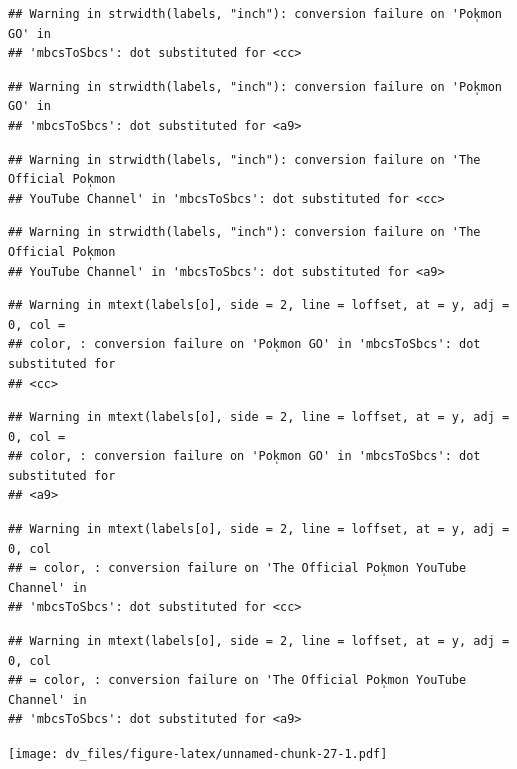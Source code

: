 \documentclass[]{article}
\begin{document}
\begin{verbatim}
## Warning in strwidth(labels, "inch"): conversion failure on 'Pok̩mon GO' in
## 'mbcsToSbcs': dot substituted for <cc>
\end{verbatim}

\begin{verbatim}
## Warning in strwidth(labels, "inch"): conversion failure on 'Pok̩mon GO' in
## 'mbcsToSbcs': dot substituted for <a9>
\end{verbatim}

\begin{verbatim}
## Warning in strwidth(labels, "inch"): conversion failure on 'The Official Pok̩mon
## YouTube Channel' in 'mbcsToSbcs': dot substituted for <cc>
\end{verbatim}

\begin{verbatim}
## Warning in strwidth(labels, "inch"): conversion failure on 'The Official Pok̩mon
## YouTube Channel' in 'mbcsToSbcs': dot substituted for <a9>
\end{verbatim}

\begin{verbatim}
## Warning in mtext(labels[o], side = 2, line = loffset, at = y, adj = 0, col =
## color, : conversion failure on 'Pok̩mon GO' in 'mbcsToSbcs': dot substituted for
## <cc>
\end{verbatim}

\begin{verbatim}
## Warning in mtext(labels[o], side = 2, line = loffset, at = y, adj = 0, col =
## color, : conversion failure on 'Pok̩mon GO' in 'mbcsToSbcs': dot substituted for
## <a9>
\end{verbatim}

\begin{verbatim}
## Warning in mtext(labels[o], side = 2, line = loffset, at = y, adj = 0, col
## = color, : conversion failure on 'The Official Pok̩mon YouTube Channel' in
## 'mbcsToSbcs': dot substituted for <cc>
\end{verbatim}

\begin{verbatim}
## Warning in mtext(labels[o], side = 2, line = loffset, at = y, adj = 0, col
## = color, : conversion failure on 'The Official Pok̩mon YouTube Channel' in
## 'mbcsToSbcs': dot substituted for <a9>
\end{verbatim}

\texttt{[image: dv\_files/figure-latex/unnamed-chunk-27-1.pdf]}
\end{document}
